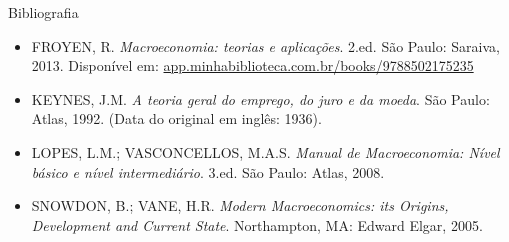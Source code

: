 \documentclass[10pt]{beamer}
\begin{document}
\begin{frame}{ Bibliografia}
    \begin{itemize}
        \item FROYEN, R. \emph{Macroeconomia: teorias e aplicações}. 2.ed. São Paulo: Saraiva, 2013. Disponível em: \href{https://app.minhabiblioteca.com.br/books/9788502175235}{app.minhabiblioteca.com.br/books/9788502175235}\medskip
        \item KEYNES, J.M. \emph{A teoria geral do emprego, do juro e da moeda}. São Paulo: Atlas, 1992. (Data do original em inglês: 1936).\medskip
        \item LOPES, L.M.; VASCONCELLOS, M.A.S. \emph{Manual de Macroeconomia: Nível básico e nível intermediário}. 3.ed. São Paulo: Atlas, 2008.\medskip
        \item SNOWDON, B.; VANE, H.R. \emph{Modern Macroeconomics: its Origins, Development and Current State}. Northampton, MA: Edward Elgar, 2005.
    \end{itemize}
\end{frame}
\end{document}
